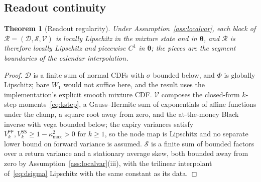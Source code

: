 \documentclass[11pt]{article}
\newtheorem{theorem}{Theorem}
\providecommand{\Rcal}{\mathcal R}
\providecommand{\1}{\mathbf 1}
\newcommand{\bth}{{\boldsymbol{\theta}}}
\begin{document}
\subsection{Readout continuity}

\begin{theorem}[Readout regularity]
\label{thm:readout}
Under Assumption~\ref{ass:localvar}, each block of $\Rcal=(\mathcal D,\mathcal S,\mathcal V)$ is locally Lipschitz in the
mixture state and in $\bth$, and $\Rcal$ is therefore locally Lipschitz and piecewise $C^1$ in
$\bth$; the pieces are the segment boundaries of the calendar interpolation.
\end{theorem}

\begin{proof}
$\mathcal D$ is a finite sum of normal CDFs with $\sigma$ bounded below, and $\Phi$ is globally Lipschitz;
bare $W_1$ would not suffice here, and the result uses the implementation's explicit smooth mixture
CDF. $\mathcal V$ composes the closed-form $k$-step moments~\eqref{eq:kstep}, a Gauss--Hermite sum of
exponentials of affine functions under the clamp, a square root away from zero, and the at-the-money
Black inverse with vega bounded below; the expiry variances satisfy
$V^{\mathsf{FF}}_k,V^{\mathsf{SS}}_k\ge1-\kappa_{\max}^2>0$ for $k\ge1$, so the node map is Lipschitz
and no separate lower bound on forward variance is assumed. $\mathcal S$ is a finite sum of bounded factors
over a return variance and a stationary average skew, both bounded away from zero by
Assumption~\ref{ass:localvar}(iii), with the trilinear interpolant of~\eqref{eq:dsigma} Lipschitz
with the same constant as its data.
\end{proof}

\end{document}
